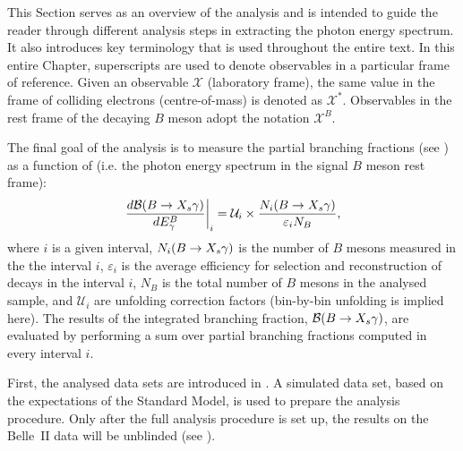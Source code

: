 This Section serves as an overview of the analysis
and is intended to guide the reader through different analysis steps in extracting the \BtoXsgamma photon energy spectrum.
It also introduces key terminology that is used throughout the entire text.
In this entire Chapter, superscripts are used to denote observables in a particular frame of reference.
Given an observable $\mathcal{X}$ (laboratory frame), the same value in the frame of colliding electrons (centre-of-mass) is denoted as $\mathcal{X}^*$.
Observables in the rest frame of the decaying $B$ meson adopt the notation $\mathcal{X}^B$.

The final goal of the analysis is to measure the partial branching fractions (see )
as a function of \EB (i.e. the photon energy spectrum in the signal $B$ meson rest frame):
\begin{equation}\label{eq:branching_fraction_recipe}
    \left.\frac{d\mathcal{B}(\BtoXsgamma)}{d\EB}\right|_i = \mathcal{U}_i \times \frac{N_i(\BtoXsgamma)}{\varepsilon_i N_{B}},
\end{equation}
where $i$ is a given \EB interval,
$N_i(\BtoXsgamma)$ is the number of $B$ mesons measured in the the interval $i$, 
$\varepsilon_i$ is the average efficiency for selection and reconstruction of \BtoXsgamma decays in the interval $i$,
$N_B$ is the total number of $B$ mesons in the analysed sample,
and $\mathcal{U}_i$ are unfolding correction factors (bin-by-bin unfolding is implied here).
The results of the integrated branching fraction, $\mathcal{B}(\BtoXsgamma)$, are evaluated by performing a sum over partial branching fractions computed in every interval $i$.

First, the analysed data sets are introduced in .
A simulated data set, based on the expectations of the Standard Model, is used to prepare the analysis procedure.
Only after the full analysis procedure is set up, the results on the Belle~II data will be unblinded (see ).

